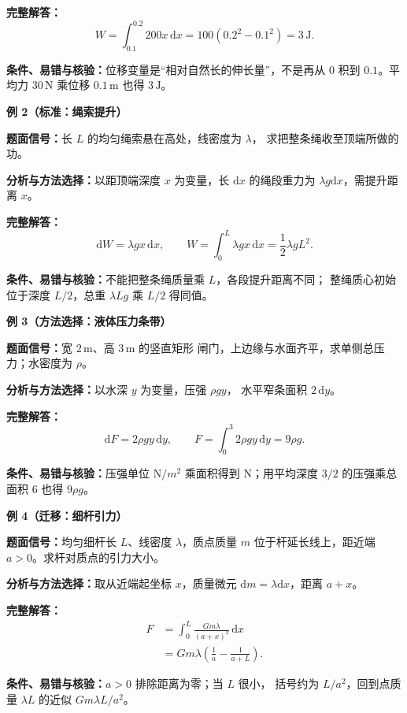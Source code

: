 \begin{knowledgeBox}
\textbf{完整解答：}
\[
W=\int_{0.1}^{0.2}200x\,\mathrm dx
=100(0.2^2-0.1^2)=3\,\mathrm J.
\]

\textbf{条件、易错与核验：}位移变量是“相对自然长的伸长量”，不是再从
\(0\) 积到 \(0.1\)。平均力 \(30\,\mathrm N\) 乘位移 \(0.1\,\mathrm m\)
也得 \(3\,\mathrm J\)。

\textbf{例 2（标准：绳索提升）}

\textbf{题面信号：}长 \(L\) 的均匀绳索悬在高处，线密度为 \(\lambda\)，
求把整条绳收至顶端所做的功。

\textbf{分析与方法选择：}以距顶端深度 \(x\) 为变量，长
\(\mathrm dx\) 的绳段重力为 \(\lambda g\mathrm dx\)，需提升距离 \(x\)。

\textbf{完整解答：}
\[
\mathrm dW=\lambda gx\,\mathrm dx,\qquad
W=\int_0^L\lambda gx\,\mathrm dx
=\frac12\lambda gL^2.
\]

\textbf{条件、易错与核验：}不能把整条绳质量乘 \(L\)，各段提升距离不同；
整绳质心初始位于深度 \(L/2\)，总重 \(\lambda Lg\) 乘 \(L/2\) 得同值。

\textbf{例 3（方法选择：液体压力条带）}

\textbf{题面信号：}宽 \(2\,\mathrm m\)、高 \(3\,\mathrm m\) 的竖直矩形
闸门，上边缘与水面齐平，求单侧总压力；水密度为 \(\rho\)。

\textbf{分析与方法选择：}以水深 \(y\) 为变量，压强 \(\rho gy\)，
水平窄条面积 \(2\,\mathrm dy\)。

\textbf{完整解答：}
\[
\mathrm dF=2\rho gy\,\mathrm dy,\qquad
F=\int_0^3 2\rho gy\,\mathrm dy=9\rho g.
\]

\textbf{条件、易错与核验：}压强单位 \(\mathrm N/m^2\) 乘面积得到
\(\mathrm N\)；用平均深度 \(3/2\) 的压强乘总面积 \(6\) 也得 \(9\rho g\)。

\textbf{例 4（迁移：细杆引力）}

\textbf{题面信号：}均匀细杆长 \(L\)、线密度 \(\lambda\)，质点质量
\(m\) 位于杆延长线上，距近端 \(a>0\)。求杆对质点的引力大小。

\textbf{分析与方法选择：}取从近端起坐标 \(x\)，质量微元
\(\mathrm dm=\lambda\mathrm dx\)，距离 \(a+x\)。

\textbf{完整解答：}
\[
\begin{aligned}
F&=\int_0^L\frac{Gm\lambda}{(a+x)^2}\,\mathrm dx\\
&=Gm\lambda\left(\frac1a-\frac1{a+L}\right).
\end{aligned}
\]

\textbf{条件、易错与核验：}\(a>0\) 排除距离为零；当 \(L\) 很小，
括号约为 \(L/a^2\)，回到点质量 \(\lambda L\) 的近似
\(Gm\lambda L/a^2\)。


\end{knowledgeBox}
